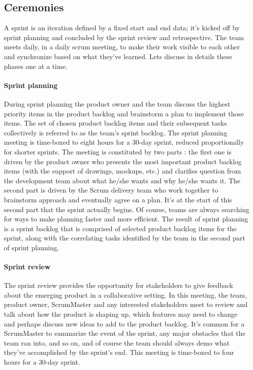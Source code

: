 \subsection{Ceremonies}
A sprint is an iteration defined by a fixed start and end data; it's kicked off by sprint planning and concluded by the sprint review and retrospective. The team meets daily, in a daily scrum meeting, to make their work visible to each other and synchronize based on what they've learned. Lets discuss in details these phases one at a time.
\paragraph{Sprint planning} During sprint planning the product owner and the team discuss the highest priority items in the product backlog and brainstorm a plan to implement those items. The set of chosen product backlog items and their subsequent tasks collectively is referred to as the team's sprint backlog. The sprint planning meeting is time-boxed to eight hours for a 30-day sprint, reduced proportionally for shorter sprints. The meeting is constituted by two parts : the first one is driven by the product owner who presents the most important product backlog items (with the support of drawings, mockups, etc.) and clarifies question from the development team about what he/she wants and why he/she wants it. The second part is driven by the Scrum delivery team who work together to brainstorm approach and eventually agree on a plan. It's at the start of this second part that the sprint actually begins. Of course, teams are always searching for ways to make planning faster and more efficient. The result of sprint planning is a sprint backlog that is comprised of selected product backlog items for the sprint, along with the correlating tasks identified by the team in the second part of sprint planning.
\paragraph{Sprint review} The sprint review provides the opportunity for stakeholders to give feedback about the emerging product in a collaborative setting. In this meeting, the team, product owner, ScrumMaster and any interested stakeholders meet to review and talk about how the product is shaping up, which features may need to change and perhaps discuss new ideas to add to the product backlog. It's common for a ScrumMaster to summarize the event of the sprint, any major obstacles that the team ran into, and so on, and of course the team should always demo what they've accomplished by the sprint's end. This meeting is time-boxed to four hours for a 30-day sprint.
